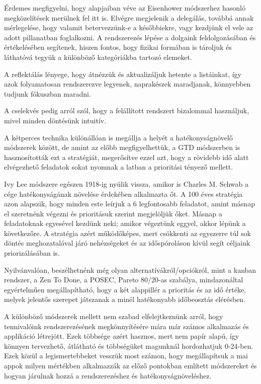 Érdemes megfigyelni, hogy alapjaiban véve az Eisenhower módszerhez hasonló megközelítések merülnek fel itt is. Elvégre megjelenik a delegálás, továbbá annak mérlegelése, hogy valamit betervezzünk-e a későbbiekre, vagy kezdjünk el vele az adott pillanatban foglalkozni.
A rendszerezés lépése a dolgaink feldolgozásában és értékelésében segítenek, hiszen fontos, hogy fizikai formában is tároljuk és láthatóvá tegyük a különböző kategóriákba tartozó elemeket.

A reflektálás lényege, hogy átnézzük és aktualizáljuk hetente a listáinkat, így azok folyamatosan rendszerezve legyenek, naprakészek maradjanak, könnyebben tudjunk fókuszban maradni.

A cselekvés pedig arról szól, hogy a felállított rendszert bizalommal használjuk, mivel minden döntésünk intuitív. \cite{gtd}



A kétperces technika különállóan is megállja a helyét a hatékonyságnövelő módszerek között, de amint az előbb megfigyelhettük, a GTD módszerben is hasznosították ezt a stratégiát, megerősítve ezzel azt, hogy a rövidebb idő alatt elvégezhető feladatok sokat nyomnak a latban a prioritási tényező mellett.


Ivy Lee módszere egészen 1918-ig nyúlik vissza, amikor is Charles M. Schwab a cége hatékonyságának növelése érdekében alkalmazta őt. A 100 éves stratégia azon alapszik, hogy minden este leírjuk a 6 legfontosabb feladatot, amint másnap el szeretnénk végezni és prioritásuk szerint megjelöljük őket. Másnap a feladatoknak egyesével kezdünk neki; amikor végeztünk eggyel, akkor lépünk a következőre. A stratégia azért működőképes, mert csökkenti az egyszerre túl sok döntés meghozatalával járó nehézségeket és az időspóroláson kívül segít céljaink priorizálásában is.\cite{ivylee}

Nyilvánvalóan, beszélhetnénk még olyan alternatívákról/opciókról, mint a kanban rendszer, a Zen To Done, a POSEC, Pareto 80/20-as szabálya, mindazonáltal egyértelműen megállapítható, hogy a két alappillér a prioritás és az idő értéke, melyek jelentős szerepet játszanak a minél hatékonyabb időbeosztás elérésben.


A különböző módszerek mellett nem szabad elfelejtkeznünk arról, hogy tennivalóink rendszerezésének megkönnyítésére mára már számos alkalmazás és applikáció létrejött. Ezek többsége azért hasznos, mert nem papír alapú, így könnyen tervezhető, átlátható és többségüket magunknál hordozhatjuk 0-24-ben. Ezek közül a legismertebbeket vesszük most számon, hogy megállapítsuk a mai appok milyen mértékben alkalmazzák az előző pontokban említett módszereket és hogyan járulnak hozzá a rendszerezéshez és hatékonyságnöveléshez.

